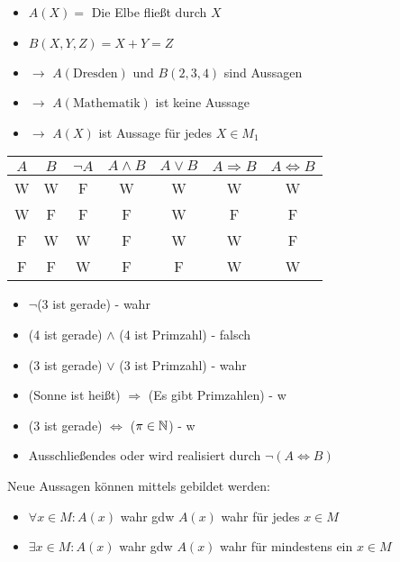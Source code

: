 \begin{example}
	\begin{itemize}
		\item $A(X)=$ Die Elbe fließt durch $X$
		\item $B(X,Y,Z)=X+Y=Z$
		\item $\to$ $A(\text{Dresden})$ und $B(2,3,4)$ sind Aussagen
		\item $\to$ $A(\text{Mathematik})$ ist keine Aussage
		\item $\to$ $A(X)$ ist Aussage für jedes $X\in M_1$
	\end{itemize}
\end{example}

\begin{center}\begin{tabular}{|c c|c c c c c|}
	\hline 
	$A$& $B$ & $\neg A$ & $A\land B$ & $A\lor B$ & $A\Rightarrow B$ & $A\iff B$ \\ 
	\hline 
	W& W & F & W & W & W & W \\ 
	W& F & F & F & W & F &  F\\ 
	F& W & W & F & W & W & F \\ 
	F& F & W & F & F & W &  W\\ 
	\hline 
\end{tabular}\end{center}

\begin{example}
	\begin{itemize}
		\item $\neg$(3 ist gerade) - wahr
		\item (4 ist gerade) $\land$ (4 ist Primzahl) - falsch
		\item (3 ist gerade) $\lor$ (3 ist Primzahl) - wahr
		\item (Sonne ist heißt) $\Rightarrow$ (Es gibt Primzahlen) - w
		\item (3 ist gerade) $\iff$ ($\pi\in\mathbb{N}$) - w
		\item Ausschließendes oder wird realisiert durch $\neg(A\iff B)$
	\end{itemize}
\end{example}

\begin{definition}[Quantoren]
	Neue Aussagen können mittels  gebildet werden:
	\begin{itemize}
		\item $\forall x\in M: A(x)$ wahr \gls{gdw} $A(x)$ wahr für jedes $x\in M$
		\item $\exists x\in M: A(x)$ wahr \gls{gdw} $A(x)$ wahr für mindestens ein $x\in M$
	\end{itemize}
\end{definition}

